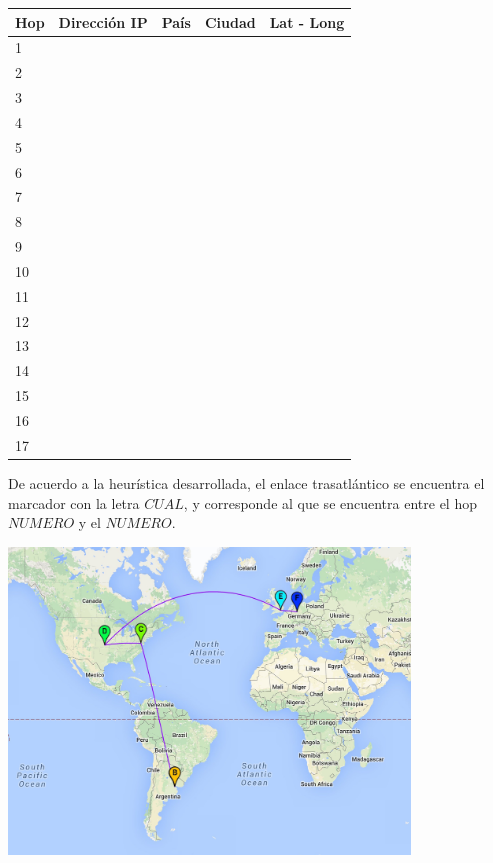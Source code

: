 \begin{center}
 \begin{tabular}{|l|l|l|l|l|}
    \hline
    Hop &Dirección IP &País &Ciudad &Lat - Long \\ \hline \hline
    1 &  & & & \\ \hline
    2 &  & & & \\ \hline
    3 &  & & & \\ \hline
    4 &  & & & \\ \hline
    5 &  & & & \\ \hline
    6 &  & & & \\ \hline
    7 &  & & & \\ \hline
    8 &  & & & \\ \hline
    9 &  & & & \\ \hline
    10 & & & & \\ \hline
    11 & & & & \\ \hline
    12 & & & & \\ \hline
    13 & & & & \\ \hline
    14 & & & & \\ \hline
    15 & & & & \\ \hline
    16 & & & & \\ \hline
    17 & & & & \\ \hline
 \end{tabular}
\end{center}

De acuerdo a la heurística desarrollada, el enlace trasatlántico se encuentra el marcador con la letra $CUAL$, y corresponde al que se encuentra entre el hop $NUMERO$ y el $NUMERO$. 

\centerline{\includegraphics[width=0.8\textwidth]{mapas/Alemania.jpeg}}

